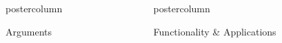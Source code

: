\documentclass[final]{beamer}\usepackage[]{graphicx}\usepackage[]{color}
\newlength{\columnheight}\setlength{\columnheight}{75cm} %
\begin{document}
{\begin{frame}
\begin{columns}
\begin{column}{.33\textwidth}
\begin{beamercolorbox}[center,wd=\textwidth]{postercolumn}
\begin{minipage}[T]{.97\textwidth}
{\begin{block}{Arguments}
\end{block}
}
\end{minipage}
\end{beamercolorbox}
\end{column}
\begin{column}{.33\textwidth}
\begin{beamercolorbox}[center,wd=\textwidth]{postercolumn}
\begin{minipage}[T]{.97\textwidth} %
\parbox[t][\columnheight]{\textwidth}{ %



\begin{block}{Functionality \& Applications}


\begin{minipage}[t][0.1mm]{.5\textwidth}
	

\end{minipage}
\end{block}}
\end{minipage}
\end{beamercolorbox}
\end{column}
\end{columns}
\end{frame}}
\end{document}
